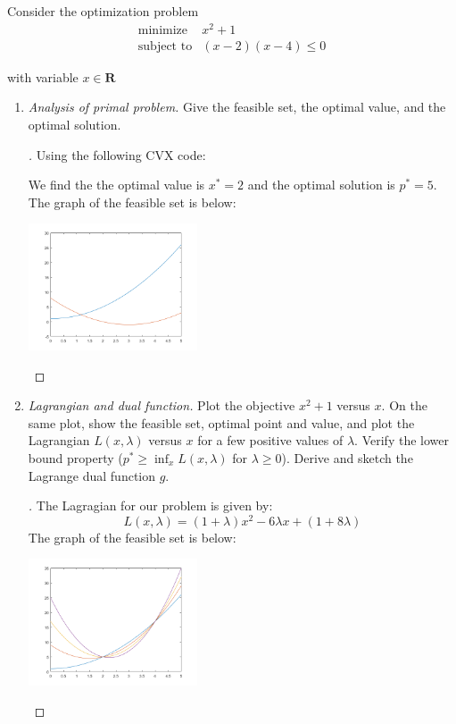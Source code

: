 \begin{prob}[4.1]
  Consider the optimization problem
  \begin{eqnarray*}
    \mbox{minimize} & x^{2} + 1\\
    \mbox{subject to} & (x-2)(x-4) \leq 0
  \end{eqnarray*}

  with variable $x \in \mathbf{R}$
\end{prob}
 \begin{enumerate}[label=(\alph*)]
  \item{\textit{Analysis of primal problem.} Give the feasible set, the optimal value, and the optimal solution.
    \begin{proof}[\sol]
      Using the following CVX code:
      
      We find the the optimal value is $x^{*} = 2$ and the optimal
      solution is $p^{*} = 5$.
      The graph of the feasible set is below:\\
      \begin{center}
\includegraphics[width=5cm]{source/img/h4q1a}
      \end{center}
      
    \end{proof}    
  }
  \item{\textit{Lagrangian and dual function.} Plot the objective $x^{2} + 1$ versus $x$. On the same plot, show the feasible set, optimal point and value, and plot the Lagrangian $L(x, \lambda)$ versus $x$ for a few positive values of $\lambda$. Verify the lower bound property ($p^{*} \geq \inf_{x} L(x, \lambda)$ for $\lambda \geq 0$). Derive and sketch the Lagrange dual function $g$.
    \begin{proof}[\sol]
      The Lagragian for our problem is given by:
      \[
      L(x,\lambda) = (1+\lambda)x^{2} - 6\lambda x + (1 + 8\lambda)
      \]
      The graph of the feasible set is below:\\
      \begin{center}
      	\includegraphics[width=5cm]{source/img/h4q1b}
  \end{center}



\end{proof}}
\end{enumerate}
